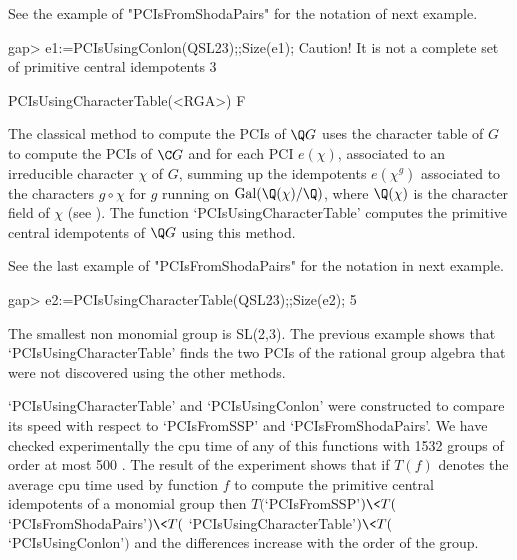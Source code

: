 See the example of "PCIsFromShodaPairs" for the notation of next example. 

\beginexample
    gap> e1:=PCIsUsingConlon(QSL23);;Size(e1);
    Caution! It is not a complete set of primitive central idempotents
    3
\endexample

\>PCIsUsingCharacterTable(<RGA>) F

The classical method to compute the PCIs of $\Q G$ uses the character 
table of $G$ to compute the PCIs of $\C G$ and for each PCI $e(\chi)$, associated to 
an irreducible character $\chi$ of $G$, summing up the idempotents $e(\chi^g)$ 
associated to the characters $g\circ \chi$ for $g$ running on ${\rm 
Gal}(\Q(\chi)/\Q)$, where $\Q(\chi)$ is the character field of $\chi$ (see 
\cite{Y}). The function `PCIsUsingCharacterTable' computes the primitive central 
idempotents of $\Q G$ using this method. 

See the last example of "PCIsFromShodaPairs" for the notation in next example. 

\beginexample
    gap> e2:=PCIsUsingCharacterTable(QSL23);;Size(e2);
    5
\endexample

The smallest non monomial group is SL(2,3). The previous example shows that 
`PCIsUsingCharacterTable' finds the two PCIs of the rational group algebra that were 
not discovered using the other methods. 

`PCIsUsingCharacterTable' and `PCIsUsingConlon' were constructed to compare its speed with 
respect to `PCIsFromSSP' and `PCIsFromShodaPairs'. We have checked experimentally the cpu time 
of any of this functions with 1532 groups of order at most 500 \cite{OR}. The result of the 
experiment shows that if $T(f)$ denotes the average cpu time used by function $f$ to compute 
the primitive central idempotents of a monomial group then $T($`PCIsFromSSP'$)\<T($ 
`PCIsFromShodaPairs'$)\<T($ `PCIsUsingCharacterTable'$)\<T($ `PCIsUsingConlon'$)$ and the 
differences increase with the order of the group.
